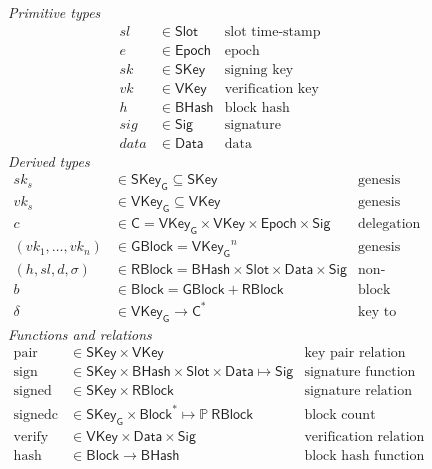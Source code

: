 \documentclass[11pt,a4paper]{article}
\newcommand{\powerset}[1]{\mathbb{P}~#1}
\newcommand{\type}[1]{\mathsf{#1}}
\newcommand{\seqof}[1]{#1^{*}}
\newcommand{\BHash}{\type{BHash}}  %
\newcommand{\Slot}{\type{Slot}}
\newcommand{\Epoch}{\type{Epoch}}
\newcommand{\GBlock}{\type{GBlock}}
\newcommand{\RBlock}{\type{RBlock}}
\newcommand{\Block}{\type{Block}}
\newcommand{\HCert}{\type{C}}
\newcommand{\SKey}{\type{SKey}}
\newcommand{\SKeyGen}{\type{SKey_G}}
\newcommand{\VKey}{\type{VKey}}
\newcommand{\VKeyGen}{\type{VKey_G}}
\newcommand{\Sig}{\type{Sig}}
\newcommand{\Data}{\type{Data}}
\newcommand{\hashname}{hash}
\newcommand{\signname}{sign}
\newcommand{\signedname}{signed}
\newcommand{\signedseqname}{signedc}
\newcommand{\verifyname}{verify}
\newcommand{\keypairname}{pair}
\newcommand{\delmap}{\delta}
\newcommand{\totalf}{\to}
\newcommand{\partialf}{\mapsto}
\begin{document}
\begin{figure}[h]
  \emph{Primitive types}
  \begin{align*}
    sl & \in \Slot  & \text{slot time-stamp}\\
     e & \in \Epoch & \text{epoch}\\
    sk & \in \SKey  & \text{signing key}\\
    vk & \in \VKey  & \text{verification key}\\
     h & \in \BHash & \text{block hash}\\
   sig & \in \Sig   & \text{signature}\\
  data & \in \Data  & \text{data}
  \end{align*}
  \emph{Derived types}
  \begin{align*}
    sk_s & \in \SKeyGen \subseteq \SKey & \text{genesis block's signing key}\\
    vk_s & \in \VKeyGen \subseteq \VKey & \text{genesis block's verification key}\\
    c & \in \HCert = \VKeyGen \times \VKey \times \Epoch \times \Sig & \text{delegation certificate}\\
    (vk_1, \dotsc, vk_n) & \in \GBlock = \VKeyGen^n & \text{genesis block} \\
    (h, sl, d, \sigma) & \in \RBlock = \BHash \times \Slot \times \Data \times \Sig
      & \text{non-genesis block} \\
    b & \in \Block = \GBlock + \RBlock & \text{block} \\
    \delmap & \in \VKeyGen \totalf \seqof{\HCert}
      & \text{key to certificate list mapping}
  \end{align*}
  \emph{Functions and relations}
  \begin{align*}
    \text{\keypairname} & \in \SKey \times \VKey & \text{key pair relation}\\
    \text{\signname} & \in \SKey \times \BHash \times \Slot \times \Data \partialf \Sig
      & \text{signature function}\\
    \text{\signedname} & \in \SKey \times \RBlock & \text{signature relation}\\
    \text{\signedseqname} & \in \SKeyGen \times \seqof{\Block} \partialf \powerset{\RBlock}
      & \text{block count function}\\
    \text{\verifyname} & \in \VKey \times \Data \times \Sig
      & \text{verification relation}\\
    \text{\hashname} & \in \Block \totalf \BHash
      & \text{block hash function}\\

\end{align*}
\end{figure}
\end{document}
